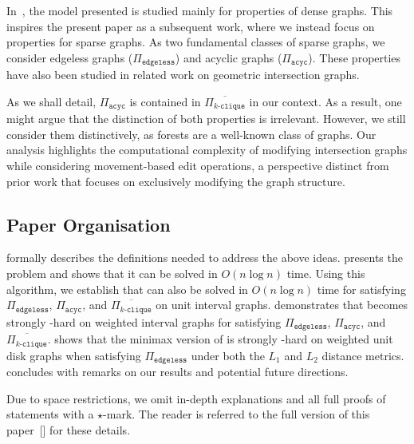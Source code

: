 

In~\cite{HonoratoDroguett2024}, the model presented is studied mainly for properties of dense graphs.
This inspires the present paper as a subsequent work, where we instead focus on properties for sparse graphs.
As two fundamental classes of sparse graphs, we consider edgeless graphs ($\Pi_{\texttt{edgeless}}$) and acyclic graphs ($\Pi_{\texttt{acyc}}$). These properties have also been studied in related work on geometric intersection graphs\cite{fomin2023,Fomin2025}.

As we shall detail, $\Pi_{\texttt{acyc}}$ is contained in $\overline{\Pi_{k\texttt{-clique}}}$ in our context.
As a result, one might argue that the distinction of both properties is irrelevant.
However, we still consider them distinctively, as forests are a well-known class of graphs.
Our analysis highlights the computational complexity of modifying intersection graphs while considering movement-based edit operations, a perspective distinct from prior work that focuses on exclusively modifying the graph structure.

\subsection*{Paper Organisation}
 formally describes the definitions needed to address the above ideas.  presents the problem {\idisp} and shows that it can be solved in $O(n\log n)$ time. Using this algorithm, we establish that {\gged} can also be solved in $O(n\log n)$ time for satisfying $\Pi_{\texttt{edgeless}}$, $\Pi_{\texttt{acyc}}$, and $\overline{\Pi_{k\texttt{-clique}}}$ on unit interval graphs.
 demonstrates that {\gged} becomes strongly \NP-hard on weighted interval graphs for satisfying $\Pi_{\texttt{edgeless}}$, $\Pi_{\texttt{acyc}}$, and $\overline{\Pi_{k\texttt{-clique}}}$.
 shows that the minimax version of {\gged} is strongly \NP-hard on weighted unit disk graphs when satisfying $\Pi_{\texttt{edgeless}}$ under both the $L_1$ and $L_2$ distance metrics.
 concludes with remarks on our results and potential future directions.


\ifConf
Due to space restrictions, we omit in-depth explanations and all full proofs of statements with a $\star$-mark. The reader is referred to the full version of this paper~[] for these details.
\fi
